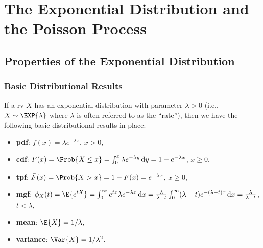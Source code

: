 \chapter{The Exponential Distribution and the Poisson Process}
\section{Properties of the Exponential Distribution}
\subsection*{Basic Distributional Results}
If a rv $ X $ has an exponential distribution with parameter $ \lambda>0 $ (i.e., $ X \sim \EXP{\lambda} $
where $ \lambda $ is often referred to as the ``rate''), then we have the following basic distributional results in place:
\begin{itemize}
    \item \textbf{pdf}: $ f(x)=\lambda e^{-\lambda x} $, $ x>0 $,
    \item \textbf{cdf}: $ F(x)=\Prob{X\le x}=\int_{0}^{x}\lambda e^{-\lambda y}\odif{y}=1-e^{-\lambda x} $, $ x\ge 0 $,
    \item \textbf{tpf}: $ \bar{F}(x)=\Prob{X>x}=1-F(x)=e^{-\lambda x} $, $ x\ge 0 $,
    \item \textbf{mgf}: $ \phi_X(t)=\E{e^{tX}}
              =\int_{0}^{\infty}e^{tx}\lambda e^{-\lambda x}\odif{x}
              =\frac{\lambda}{\lambda-t}\int_{0}^{\infty}(\lambda-t)e^{-(\lambda-t)x}\odif{x}
              =\frac{\lambda}{\lambda-t} $, $ t<\lambda $,
    \item \textbf{mean}: $ \E{X}=1/\lambda $,
    \item \textbf{variance}: $ \Var{X}=1/\lambda^2 $.
\end{itemize}
